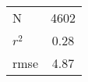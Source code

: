 \documentclass[12pt]{article}
\begin{document}
\begin{enumerate}
\begin{table}
\begin{tabular}{l*{1}{c}}
\hline
N                                                 &        4602   \\
$r^2$                                                &           0.28   \\
rmse                                              &           4.87   \\
\hline\hline
\end{tabular}
\end{table}

\end{enumerate}
\end{document}

